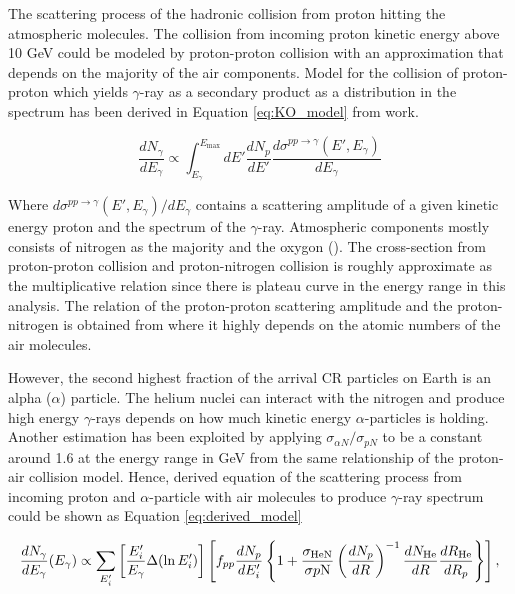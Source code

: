 The scattering process of the hadronic collision from proton hitting 
the atmospheric molecules. The collision from incoming proton kinetic 
energy above 10 GeV could be modeled by proton-proton collision with 
an approximation that depends on the majority of the air components.
Model for the collision of proton-proton which yields $\gamma$-ray 
as a secondary product as a distribution in the spectrum has been 
derived in Equation \ref{eq:KO_model} from \cite{K&Omodel} work.

\begin{equation}
    \frac{dN_\gamma}{dE_\gamma} \propto \int^{E_{\text{max}}}_{E_\gamma} dE'\frac{dN_p}{dE'} \frac{d\sigma^{pp\rightarrow\gamma}(E',E_\gamma)}{dE_\gamma}
    \label{eq:KO_model}
\end{equation}

Where $d\sigma^{pp\rightarrow\gamma}(E',E_\gamma)/dE_\gamma$ contains 
a scattering amplitude of a given kinetic energy proton and the 
spectrum of the $\gamma$-ray. Atmospheric components mostly consists 
of nitrogen as the majority and the oxygon (\cite{atmosCompos}). The cross-section from 
proton-proton collision and proton-nitrogen collision is roughly 
approximate as the multiplicative relation since there is plateau 
curve in the energy range in this analysis. The relation of the proton-proton 
scattering amplitude and the proton-nitrogen is obtained from \cite{WAtwater}
where it highly depends on the atomic numbers of the air molecules. 

However, the second highest fraction of the arrival CR particles on 
Earth is an alpha ($\alpha$) particle. The helium nuclei can interact with the nitrogen and produce high energy $\gamma$-rays depends on
how much kinetic energy $\alpha$-particles is holding. Another 
estimation has been exploited by applying $\sigma_{\alpha N}/\sigma_{pN}$
to be a constant around 1.6 at the energy range in GeV from 
the same relationship of the proton-air collision model. Hence, derived
equation of the scattering process from incoming 
proton and $\alpha$-particle with air molecules to produce $\gamma$-ray
spectrum could be shown as Equation \ref{eq:derived_model}

\begin{equation}
    \frac{dN_{\gamma}}{dE_\gamma}(E_\gamma) \propto
    \sum_{E'_i}\left[\frac{E'_i}{E_{\gamma}}\Delta(\ln E'_i) \right]
    \left[ 
        f_{pp}\frac{dN_p}{dE'_i}
        \left\{
            1+\frac{\sigma_{\text{HeN}}}{\sigma{p\rm N}}\left(\frac{dN_p}{dR}\right)^{-1} \frac{dN_{\text{He}}}{dR} \frac{dR_{\text{He}}}{dR_p} 
        \right\}
    \right]
    ,\label{eq:derived_model}
\end{equation}

